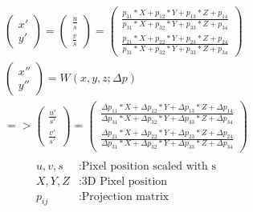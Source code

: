 \documentclass[11pt,a4paper,titlepage,oneside]{report}
\begin{document}
\begin{equation}\label{eq:pe_projection}
  \begin{gathered}
    \begin{pmatrix}
      x' \\
      y' 
    \end{pmatrix}=
    \begin{pmatrix}
      \frac{u}{s} \\
      \frac{v}{s} 
    \end{pmatrix}=
    \begin{pmatrix}
      \frac{p_{11}*X + p_{12}*Y + p_{13}*Z + p_{14}}{p_{31}*X + p_{32}*Y + p_{33}*Z + p_{34}}  \\
      \frac{p_{21}*X + p_{22}*Y + p_{23}*Z + p_{24}}{p_{31}*X + p_{32}*Y + p_{33}*Z + p_{34}}
    \end{pmatrix}\\
    \begin{pmatrix}
      x'' \\
      y'' 
    \end{pmatrix}=W(x,y,z;\Delta p)\\
    =>\begin{pmatrix}
      \frac{u'}{s'} \\
      \frac{v'}{s'} 
    \end{pmatrix}=
    \begin{pmatrix}
      \frac{\Delta p_{11}*X + \Delta p_{12}*Y + \Delta p_{13}*Z + \Delta p_{14}}{\Delta p_{31}*X + \Delta p_{32}*Y + \Delta p_{33}*Z + \Delta p_{34}}  \\
      \frac{\Delta p_{21}*X + \Delta p_{22}*Y + \Delta p_{23}*Z + \Delta p_{24}}{\Delta p_{31}*X + \Delta p_{32}*Y + \Delta p_{33}*Z + \Delta p_{34}}
    \end{pmatrix}\\
  \end{gathered}
\end{equation}
\begin{align*}
  u,v,s      &:  \text{Pixel position scaled with s}\\
  X,Y,Z      &:  \text{3D Pixel position}\\
  p_{ij}    &:  \text{Projection matrix}\\
\end{align*}
\end{document}
